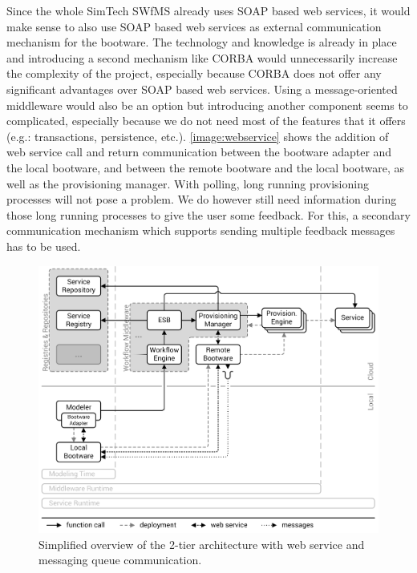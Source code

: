 Since the whole SimTech SWfMS already uses SOAP based web services, it would make sense to also use SOAP based web services as external communication mechanism for the bootware.
The technology and knowledge is already in place and introducing a second mechanism like CORBA would unnecessarily increase the complexity of the project, especially because CORBA does not offer any significant advantages over SOAP based web services.
Using a message-oriented middleware would also be an option but introducing another component seems to complicated, especially because we do not need most of the features that it offers (e.g.: transactions, persistence, etc.).
\autoref{image:webservice} shows the addition of web service call and return communication between the bootware adapter and the local bootware, and between the remote bootware and the local bootware, as well as the provisioning manager.
With polling, long running provisioning processes will not pose a problem.
We do however still need information during those long running processes to give the user some feedback.
For this, a secondary communication mechanism which supports sending multiple feedback messages has to be used.

\begin{figure}[!htbp]
	\centering
	\includegraphics[resolution=600]{design/assets/message_queue}
	\caption{Simplified overview of the 2-tier architecture with web service and messaging queue communication.}
	\label{image:message_queue}
\end{figure}

